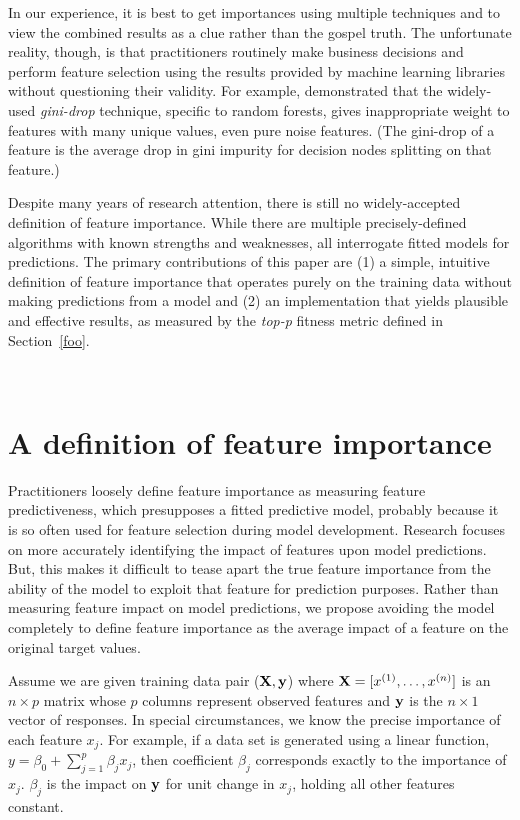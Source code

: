 \documentclass[12pt]{article}
\newcommand{\secref}[1]{Section~\ref{#1}}
\newcommand{\todo}[1]{{{\color{red}{[#1]}}}}
\begin{document}
In our experience, it is best to get importances using multiple techniques and to view the combined results as a clue rather than the gospel truth.  The unfortunate reality, though, is that practitioners routinely make business decisions and  perform feature selection using the results provided by machine learning libraries without questioning their validity.  For example, \cite{rfpimp} demonstrated that the widely-used {\em gini-drop} technique, specific to random forests, gives inappropriate weight to features with many unique values, even pure noise features. (The gini-drop of a feature is the average drop in gini impurity for decision nodes splitting on that feature.) \todo{transition}

Despite many years of research attention, there is still no widely-accepted definition of feature importance. While there are multiple precisely-defined algorithms with known strengths and weaknesses, all interrogate fitted models for predictions. The primary contributions of this paper are (1) a simple, intuitive definition of feature importance that operates purely on the training data without making predictions from a model and (2) an implementation that yields plausible and effective results, as measured by the {\em top-p} fitness metric defined in \secref{foo}.

~\\
\noindent \todo{Likely a good spot for a paper walk-through}

\section{A definition of feature importance}\label{sec:def}

Practitioners loosely define feature importance as measuring feature predictiveness, which presupposes a fitted predictive model, probably because it is so often used for feature selection during model development.  Research  focuses on more accurately identifying the impact of features upon model predictions.  But, this makes it difficult to tease apart the true feature importance from the ability of the model to exploit that feature for prediction purposes. Rather than measuring feature impact on model predictions, we propose avoiding the model completely to define feature importance as the average impact of a feature on the original target values.

Assume we are given training data pair ($\bf X, y$) where ${\bf X} = [x^{(1)}, \ldots, x^{(n)}]$ is an $n \times p$ matrix whose $p$ columns represent observed features and ${\bf y}$ is the $n \times 1$ vector of responses. In special circumstances, we know the precise importance of each feature $x_j$.  For example, if a data set is generated using a linear function, $y = \beta_0 + \sum_{j=1}^p \beta_j x_j$, \todo{assumes independence of $x_j$?} then coefficient $\beta_j$ corresponds exactly to the importance of $x_j$.  $\beta_j$ is the impact on $\bf y$ for unit change in $x_j$, holding all other features constant.
\end{document}
